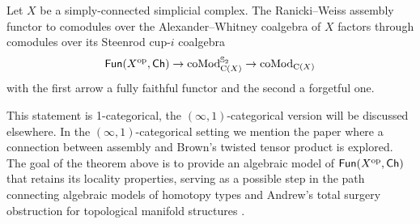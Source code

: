 \begin{theorem*}
	Let $X$ be a simply-connected simplicial complex.
	The Ranicki--Weiss assembly functor to comodules over the Alexander--Whitney coalgebra of $X$ factors through comodules over its Steenrod cup-$i$ coalgebra
	\[
	\mathsf{Fun}(X^{\mathrm{op}}, \mathsf{Ch}) \to \operatorname{coMod}^{\mathbb{S}_2}_{\operatorname{C}(X)} \to \operatorname{coMod}_{\operatorname{C}(X)}
	\]
	with the first arrow a fully faithful functor and the second a forgetful one.
\end{theorem*}

This statement is 1-categorical, the $(\infty,1)$-categorical version will be discussed elsewhere.
In the $(\infty,1)$-categorical setting we mention the paper \cite{rivera2020system} where a connection between assembly and Brown's twisted tensor product is explored.
The goal of the theorem above is to provide an algebraic model of $\mathsf{Fun}(X^{\mathrm{op}},\mathsf{Ch})$ that retains its locality properties, serving as a possible step in the path connecting algebraic models of homotopy types \cite{quillen1969rational, sullivan1977infinitesimal,mandell2001padic} and Andrew's total surgery obstruction for topological manifold structures \cite{ranicki1979obstruction,ranicki1992topological,macko2013obstruction}.